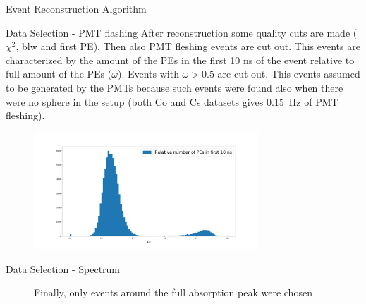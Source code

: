 \documentclass{beamer}
\begin{document}
\begin{frame}{Event Reconstruction Algorithm}

\end{frame}

\begin{frame}{Data Selection - PMT flashing}
After reconstruction some quality cuts are made ($\chi^2$, blw and first PE). Then also PMT fleshing events are cut out. This events are characterized by the amount of the PEs in the first 10 ns of the event relative to full amount of the PEs ($\omega$). Events with $\omega>0.5$ are cut out. This events assumed to be generated by the PMTs because such events were found also when there were no sphere in the setup (both Co and Cs datasets gives $0.15$~Hz of PMT fleshing). 
\begin{figure}[h]
    \centering
    \includegraphics[width=0.75\textwidth]{w.png}
\end{figure}
\end{frame}

\begin{frame}{Data Selection - Spectrum}
\begin{figure}
Finally, only events around the full absorption peak were chosen
\qquad
\end{figure}
\end{frame}
\end{document}
